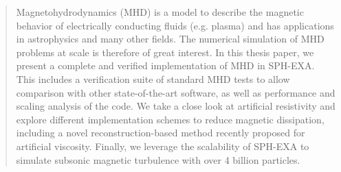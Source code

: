 \begin{abstract}
Magnetohydrodynamics (MHD) is a model to describe the magnetic behavior of electrically conducting fluids (e.g. plasma) and has applications in astrophysics and many other fields. The numerical simulation of MHD problems at scale is therefore of great interest. In this thesis paper, we present a complete and verified implementation of MHD in SPH-EXA. This includes a verification suite of standard MHD tests to allow comparison with other state-of-the-art software, as well as performance and scaling analysis of the code. We take a close look at artificial resistivity and explore different implementation schemes to reduce magnetic dissipation, including a novel reconstruction-based method recently proposed for artificial viscosity. Finally, we leverage the scalability of SPH-EXA to simulate subsonic magnetic turbulence with over 4 billion particles. 

\end{abstract}